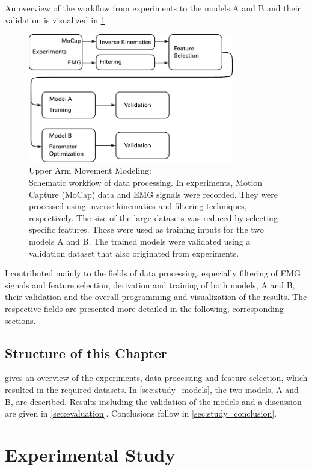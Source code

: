 An overview of the workflow from experiments to the models A and B and their validation is visualized in \cref{fig:schematitc}.
\begin{figure}%
  \centering%
  \includegraphics[width=0.8\textwidth]{images/summer_school_study/schematitc.pdf}%
  \caption{Upper Arm Movement Modeling:\\ Schematic workflow of data processing. In experiments, Motion Capture (MoCap) data and EMG signals were recorded. They were processed using inverse kinematics and filtering techniques, respectively. The size of the large datasets was reduced by selecting specific features. Those were used as training inputs for the two models A and B. The trained models were validated using a validation dataset that also originated from experiments.}%
  \label{fig:schematitc}%
\end{figure}%
%
I contributed mainly to the fields of data processing, especially filtering of EMG signals and feature selection, derivation and training of both models, A and B, their validation and the overall programming and visualization of the results. The respective fields are presented more detailed in the following, corresponding sections.

\subsection{Structure of this Chapter}
 gives an overview of the experiments, data processing and feature selection, which resulted in the required datasets. In \cref{sec:study_models}, the two models, A and B, are described. Results including the validation of the models and a discussion are given in \cref{sec:evaluation}. Conclusions follow in \cref{sec:study_conclusion}.

\section{Experimental Study}\label{sec:exp_study}

